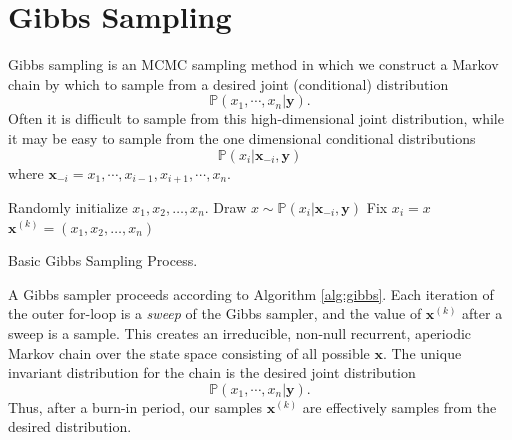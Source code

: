 
\section*{Gibbs Sampling}
Gibbs sampling is an MCMC sampling method in which we construct a Markov chain by which to sample from a desired joint (conditional) distribution
\begin{equation*}
\mathbb{P}(x_{1},\cdots,x_{n} | \mathbf{y}).
\end{equation*}
Often it is difficult to sample from this high-dimensional joint distribution, while it may be easy to sample from the one dimensional
conditional distributions
\begin{equation*}
\mathbb{P}(x_{i} | \mathbf{x}_{-i}, \mathbf{y})
\end{equation*}
where $\mathbf{x}_{-i} = x_{1},\cdots,x_{i-1},x_{i+1},\cdots,x_{n}.$

\begin{algorithm}
\begin{algorithmic}[1]
    \State \textrm{Randomly initialize } $x_1,x_2,\ldots,x_n$.
            \State \textrm{Draw } $x \sim \mathbb{P}(x_{i} | \mathbf{x}_{-i}, \mathbf{y})$
            \State \textrm{Fix } $x_i = x$
        \EndFor
        \State $\mathbf{x}^{(k)}= (x_1,x_2,\ldots,x_n)$
    \EndFor
\EndProcedure
\end{algorithmic}
\caption{Basic Gibbs Sampling Process.}
\label{alg:gibbs}
\end{algorithm}
A Gibbs sampler proceeds according to Algorithm \ref{alg:gibbs}.
Each iteration of the outer for-loop is a \emph{sweep} of the Gibbs sampler, and the value of $\mathbf{x}^{(k)}$ after a sweep is a sample. This creates an irreducible, non-null recurrent, aperiodic Markov chain over the state space consisting of all possible $\mathbf{x}$. The unique invariant distribution for the chain is the desired joint distribution
\begin{equation*}
\mathbb{P}(x_{1},\cdots,x_{n} | \mathbf{y}).
\end{equation*}
Thus, after a burn-in period, our samples $\mathbf{x}^{(k)}$ are effectively samples from the desired distribution.


